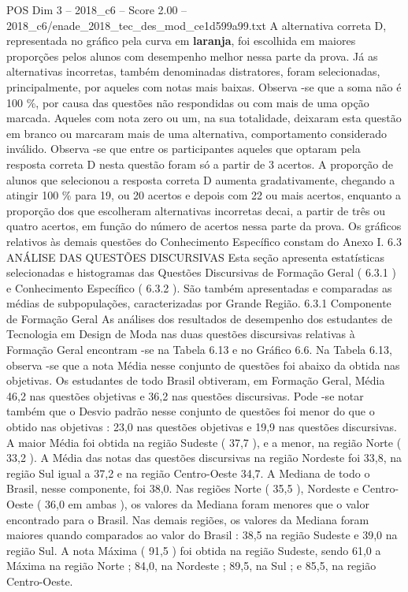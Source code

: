 \begin{textsample}{POS Dim 3 – 2018\_c6 – Score 2.00 – 2018\_c6/enade\_2018\_tec\_des\_mod\_ce1d599a99.txt}
A alternativa correta D, representada no gráfico pela curva em \textbf{laranja}, foi escolhida em maiores proporções pelos alunos com desempenho melhor nessa parte da prova.
Já as alternativas incorretas, também denominadas distratores, foram selecionadas, principalmente, por aqueles com notas mais baixas.
Observa -se que a soma não é 100 \%, por causa das questões não respondidas ou com mais de uma opção marcada.
Aqueles com nota zero ou um, na sua totalidade, deixaram esta questão em branco ou marcaram mais de uma alternativa, comportamento considerado inválido.
Observa -se que entre os participantes aqueles que optaram pela resposta correta D nesta questão foram só a partir de 3 acertos.
A proporção de alunos que selecionou a resposta correta D aumenta gradativamente, chegando a atingir 100 \% para 19, ou 20 acertos e depois com 22 ou mais acertos, enquanto a proporção dos que escolheram alternativas incorretas decai, a partir de três ou quatro acertos, em função do número de acertos nessa parte da prova.
Os gráficos relativos às demais questões do Conhecimento Específico constam do Anexo I. 6.3 ANÁLISE DAS QUESTÕES DISCURSIVAS Esta seção apresenta estatísticas selecionadas e histogramas das Questões Discursivas de Formação Geral ( 6.3.1 ) e Conhecimento Específico ( 6.3.2 ).
São também apresentadas e comparadas as médias de subpopulações, caracterizadas por Grande Região. 6.3.1 Componente de Formação Geral As análises dos resultados de desempenho dos estudantes de Tecnologia em Design de Moda nas duas questões discursivas relativas à Formação Geral encontram -se na Tabela 6.13 e no Gráfico 6.6.
Na Tabela 6.13, observa -se que a nota Média nesse conjunto de questões foi abaixo da obtida nas objetivas.
Os estudantes de todo Brasil obtiveram, em Formação Geral, Média 46,2 nas questões objetivas e 36,2 nas questões discursivas.
Pode -se notar também que o Desvio padrão nesse conjunto de questões foi menor do que o obtido nas objetivas : 23,0 nas questões objetivas e 19,9 nas questões discursivas.
A maior Média foi obtida na região Sudeste ( 37,7 ), e a menor, na região Norte ( 33,2 ).
A Média das notas das questões discursivas na região Nordeste foi 33,8, na região Sul igual a 37,2 e na região Centro-Oeste 34,7.
A Mediana de todo o Brasil, nesse componente, foi 38,0.
Nas regiões Norte ( 35,5 ), Nordeste e Centro-Oeste ( 36,0 em ambas ), os valores da Mediana foram menores que o valor encontrado para o Brasil.
Nas demais regiões, os valores da Mediana foram maiores quando comparados ao valor do Brasil : 38,5 na região Sudeste e 39,0 na região Sul.
A nota Máxima ( 91,5 ) foi obtida na região Sudeste, sendo 61,0 a Máxima na região Norte ; 84,0, na Nordeste ; 89,5, na Sul ; e 85,5, na região Centro-Oeste.

\end{textsample}
